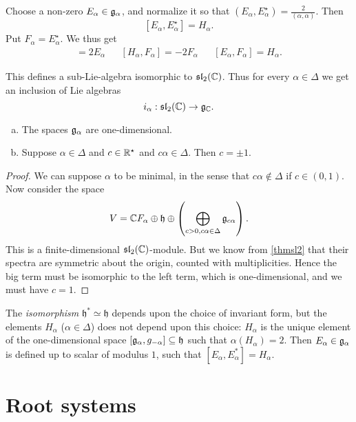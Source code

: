 \documentclass[11pt, english]{article}
\begin{document}
Choose a non-zero $E_\alpha \in \mathfrak g_\alpha$, and normalize it so that $(E_\alpha,E_\alpha^\star) = \frac{2}{(\alpha,\alpha)}$. Then
$$
[E_\alpha,E_\alpha^\star] = H_\alpha.
$$
Put $F_\alpha = E_\alpha^\star$. We thus get
\begin{align*}
  [H_\alpha, E_\alpha] = 2 E_\alpha && [H_\alpha ,F_\alpha] = -2F_\alpha && [E_\alpha, F_\alpha] = H_\alpha.
\end{align*}

This defines a sub-Lie-algebra isomorphic to $\mathfrak{sl}_2(\mathbb{C})$. Thus for every $\alpha \in \Delta$ we get an inclusion of Lie algebras
$$
i_\alpha: \mathfrak{sl}_2(\mathbb{C}) \to \mathfrak g_{\mathbb{C}}.
$$

\begin{lemma}
\begin{enumerate}[a)]
\item The spaces $\mathfrak g_\alpha$ are one-dimensional.
\item Suppose $\alpha \in \Delta$ and $c \in \mathbb{R}^\star$ and $c\alpha \in \Delta$. Then $c = \pm 1$.
\end{enumerate}
\end{lemma}
\begin{proof}
We can suppose $\alpha$ to be minimal, in the sense that $c \alpha \not \in \Delta$ if $c \in (0,1)$. Now consider the space
$$
V = \mathbb{C} F_\alpha \oplus \mathfrak h \oplus \left( \bigoplus_{c > 0, c \alpha \in \Delta} \mathfrak g_{c \alpha} \right).
$$
This is a finite-dimensional $\mathfrak{sl}_2(\mathbb{C})$-module. But we know from \ref{thmsl2} that their spectra are symmetric about the origin, counted with multiplicities. Hence the big term must be isomorphic to the left term, which is one-dimensional, and we must have $c=1$.
\end{proof}

\begin{remark}
  The \emph{isomorphism} $\mathfrak h ^\ast \simeq \mathfrak h$ depends upon the choice of invariant form, but the elements $H_\alpha$ ($\alpha \in \Delta$) does not depend upon this choice: $H_\alpha$ is the unique element of the one-dimensional space $[\mathfrak g_\alpha, g_{-\alpha}] \subseteq \mathfrak h$ such that $\alpha(H_\alpha)=2$. Then $E_\alpha \in \mathfrak g_\alpha$ is defined up to scalar of modulus $1$, such that $[E_\alpha, E_\alpha^\ast] = H_\alpha$. 
\end{remark}

\newpage
\section{Root systems}
\end{document}
